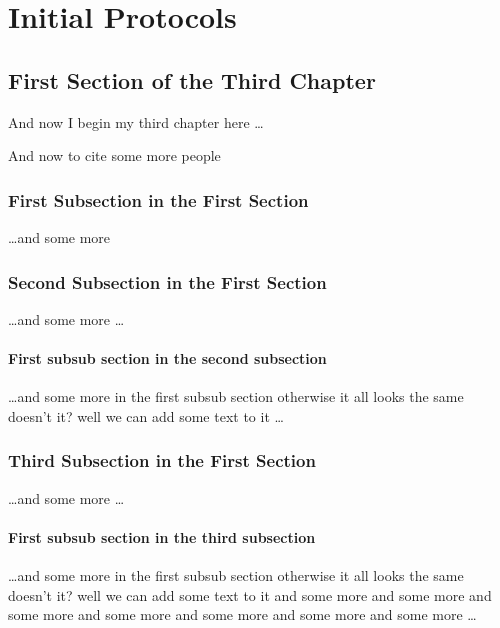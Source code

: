 \chapter{Initial Protocols}

\ifpdf
    \graphicspath{{Chapter3/Figs/Raster/}{Chapter3/Figs/PDF/}{Chapter3/Figs/}}
\else
    \graphicspath{{Chapter3/Figs/Vector/}{Chapter3/Figs/}}
\fi

\section{First Section of the Third Chapter}
And now I begin my third chapter here \dots

And now to cite some more people~\citet{Rea85,Ancey1996}

\subsection{First Subsection in the First Section}
\dots and some more 

\subsection{Second Subsection in the First Section}
\dots and some more \dots

\subsubsection{First subsub section in the second subsection}
\dots and some more in the first subsub section otherwise it all looks the same
doesn't it? well we can add some text to it \dots

\subsection{Third Subsection in the First Section}
\dots and some more \dots

\subsubsection{First subsub section in the third subsection}
\dots and some more in the first subsub section otherwise it all looks the same
doesn't it? well we can add some text to it and some more and some more and
some more and some more and some more and some more and some more \dots

